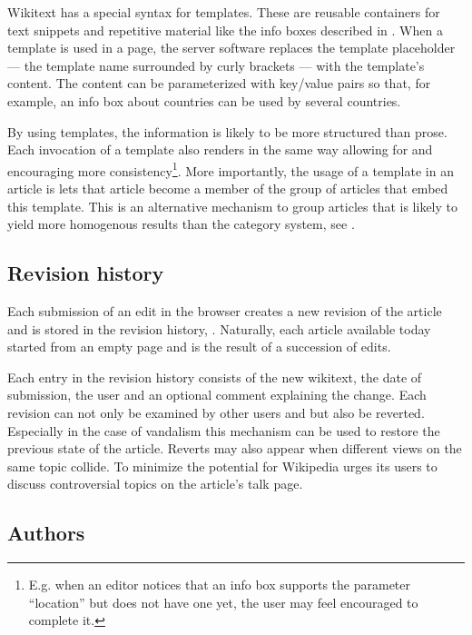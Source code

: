 Wikitext has a special syntax for templates. 
These are reusable containers for text snippets and repetitive material like the info boxes described in .
When a template is used in a page, the server software replaces the template placeholder --- the template name surrounded by curly brackets --- with the template's content.
The content can be parameterized with key/value pairs so that, for example, an info box about countries can be used by several countries.

By using templates, the information is likely to be more structured than prose.
Each invocation of a template also renders in the same way allowing for and encouraging more consistency\footnote{E.g. when an editor notices that an info box supports the parameter ``location'' but does not have one yet, the user may feel encouraged to complete it.}.
More importantly, the usage of a template in an article is lets that article become a member of the group of articles that embed this template.
This is an alternative mechanism to group articles that is likely to yield more homogenous results than the category system, see .

\subsection{Revision history}

Each submission of an edit in the browser creates a new revision of the article and is stored in the revision history, .
Naturally, each article available today started from an empty page and is the result of a succession of edits.


Each entry in the revision history consists of the new wikitext, the date of submission, the user and an optional comment explaining the change.
Each revision can not only be examined by other users and but also be reverted. 
Especially in the case of vandalism this mechanism can be used to restore the previous state of the article.
Reverts may also appear when different views on the same topic collide.
To minimize the potential for \cite{suh2007us} Wikipedia urges its users to discuss controversial topics on the article's talk page.

\subsection{Authors}

